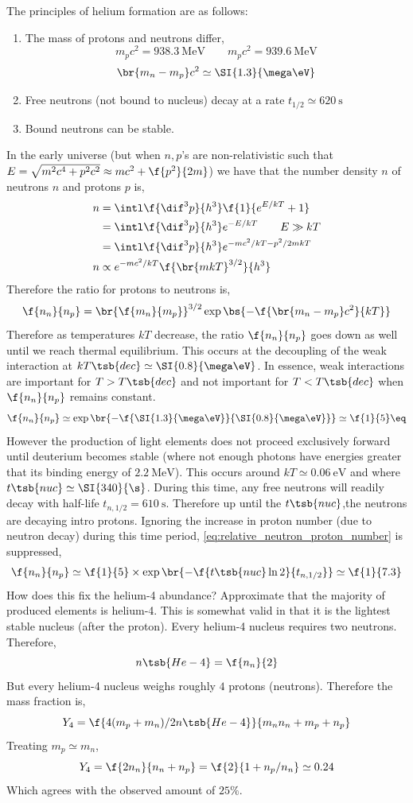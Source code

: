 \documentclass{article}
\begin{document}
The principles of helium formation are as follows:
\begin{enumerate}
    \item The mass of protons and neutrons differ,
    \[ m_p c^2 = \SI{938.3}{\mega \eV} \qquad m_p c^2 = \SI{939.6}{\mega \eV} \]
    \[ \br{m_n - m_p} c^2 \simeq \SI{1.3}{\mega \eV} \]
    \item Free neutrons (not bound to nucleus) decay at a rate $t_{1/2} \simeq \SI{620}{\s}$
    \item Bound neutrons can be stable.
\end{enumerate}
In the early universe (but when $n,p$'s are non-relativistic such that $E = \sqrt{m^2 c^4 + p^2 c^2} \approx m c^2 + \f{p^2}{2m}$) we have that the number density $n$ of neutrons $n$ and protons $p$ is,
\begin{align*}
    n
    &= \intl \f{\dif^3 p}{h^3} \f{1}{e^{E/kT} + 1} \\
    &= \intl \f{\dif^3 p}{h^3} e^{-E/kT} \qquad E \gg k T \\
    &= \intl \f{\dif^3 p}{h^3} e^{-mc^2/kT - p^2/2mkT} \\
    n &\propto e^{-mc^2/kT} \f{\br{mkT}^{3/2}}{h^3}
\end{align*}
Therefore the ratio for protons to neutrons is,
\[ \f{n_n}{n_p} = \br{\f{m_n}{m_p}}^{3/2} \exp\bs{- \f{\br{m_n - m_p}c^2}{k T}} \]
Therefore as temperatures $kT$ decrease, the ratio $\f{n_n}{n_p}$ goes down as well until we reach thermal equilibrium. This occurs at the decoupling of the weak interaction at $k T\tsb{dec} \simeq \SI{0.8}{\mega \eV}$. In essence, weak interactions are important for $T > T\tsb{dec}$ and not important for $T < T\tsb{dec}$ when $\f{n_n}{n_p}$ remains constant.
\[ \f{n_n}{n_p} \simeq \exp\br{-\f{\SI{1.3}{\mega\eV}}{\SI{0.8}{\mega\eV}}}\simeq \f{1}{5} \eq \label{eq:relative_neutron_proton_number}\]
However the production of light elements does not proceed exclusively forward until deuterium becomes stable (where not enough photons have energies greater that its binding energy of $\SI{2.2}{\mega \eV}$). This occurs around $kT \simeq \SI{0.06}{\eV}$ and where $t\tsb{nuc} \simeq \SI{340}{\s}$. During this time, any free neutrons will readily decay with half-life $t_{n,1/2}= \SI{610}{\s}$. Therefore up until the $t\tsb{nuc}$,the neutrons are decaying intro protons. Ignoring the increase in proton number (due to neutron decay) during this time period, \cref{eq:relative_neutron_proton_number} is suppressed,
\[ \f{n_n}{n_p} \simeq \f{1}{5} \times \exp\br{- \f{t\tsb{nuc}\ln 2}{t_{n,1/2}}} \simeq \f{1}{7.3}  \]
How does this fix the helium-4 abundance? Approximate that the majority of produced elements is helium-4. This is somewhat valid in that it is the lightest stable nucleus (after the proton). Every helium-4 nucleus requires two neutrons. Therefore,
\[ n\tsb{He-4} = \f{n_n}{2}\]
But every helium-4 nucleus weighs roughly $4$ protons (neutrons). Therefore the mass fraction is,
\[ Y_4 = \f{4 (m_p + m_n)/2 n\tsb{He-4}}{m_n n_n + m_p + n_p} \]
Treating $m_p \simeq m_n$,
\[ Y_4 = \f{2 n_n}{n_n +n_p} = \f{2}{1 + n_p / n_n} \simeq 0.24 \]
Which agrees with the observed amount of $25 \%$.
\end{document}
